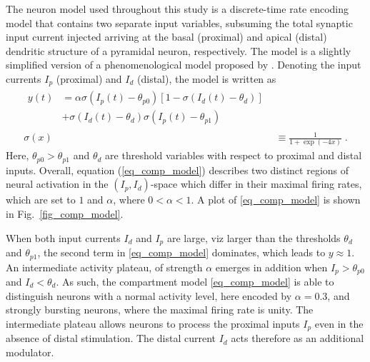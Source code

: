 \documentclass[utf8]{frontiersSCNS} %
\begin{document}
The neuron model used throughout this study 
is a discrete-time rate encoding model that 
contains two separate input variables, 
subsuming the total synaptic input current injected arriving 
at the basal (proximal) and apical (distal) 
dendritic structure of a pyramidal neuron, respectively. 
The model is a slightly simplified version of a phenomenological 
model proposed by \citet{Shai_2015}. Denoting the input currents 
$I_p$ (proximal) and $I_d$ (distal), 
the model is written as
\begin{align}
\begin{split}
y\left(t\right) &= \alpha  \sigma\left( I_p(t) - \theta_{p0} \right)
\left[1-\sigma\left(I_d(t) - \theta_d\right)\right] \\
&+ \sigma\left(I_d(t) - \theta_d \right)
\sigma\left( I_p(t) - \theta_{p1} \right)
\end{split} 
\label{eq_comp_model}\\
\sigma(x) &\equiv \frac{1}{1+\exp(-4x)} \; .
\end{align}
Here, $\theta_{p0}>\theta_{p1}$ and $\theta_d$ 
are threshold variables with respect to proximal 
and distal inputs. Overall, equation 
(\ref{eq_comp_model}) describes two distinct
regions of neural activation in the 
$(I_p, I_d)$-space which differ in their
maximal firing rates, which are set to $1$ and 
$\alpha$, where $0 < \alpha < 1$.
A plot of \eqref{eq_comp_model} is shown 
in Fig.~\ref{fig_comp_model}.

When both input currents $I_d$ and $I_p$ 
are large, viz larger than the 
thresholds $\theta_d$ and $\theta_{p1}$,
the second term in \eqref{eq_comp_model}
dominates, which leads to $y\approx 1$. 
An intermediate activity plateau, of
strength $\alpha$ emerges in addition 
when $I_p>\theta_{p0}$ and 
$I_d<\theta_{d}$. As such, the compartment
model \eqref{eq_comp_model} is able to
distinguish neurons with a normal activity 
level, here encoded by $\alpha=0.3$, and
strongly bursting neurons, where the maximal
firing rate is unity. The intermediate plateau
allows neurons to process the proximal 
inputs $I_p$ even in the absence of distal
stimulation. The distal current $I_d$
acts therefore as an additional modulator.
\end{document}

